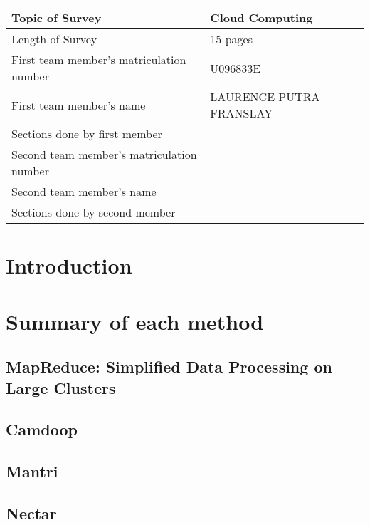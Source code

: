 \documentclass[]{article}
\begin{document}
\begin{table}[here]
\centering
\begin{tabularx}{0.7\textwidth}{| X | X | }
\hline
Topic of Survey						& 	Cloud Computing\\
\hline
Length of Survey						& 	15 pages\\
\hline
First team member's matriculation number	&	U096833E\\
\hline
First team member's name				&	LAURENCE PUTRA FRANSLAY\\
\hline
Sections done by first member				& 	\\
\hline
Second team member's matriculation number	&	\\
\hline
Second team member's name				&	\\
\hline
Sections done by second member			& 	\\
\hline

\hline
\end{tabularx}
\end{table}

\pagebreak

\section{Introduction}

\section{Summary of each method}
\subsection{MapReduce: Simplified Data Processing on Large Clusters}

\subsection{Camdoop}

\subsection{Mantri}

\subsection{Nectar}
\end{document}
